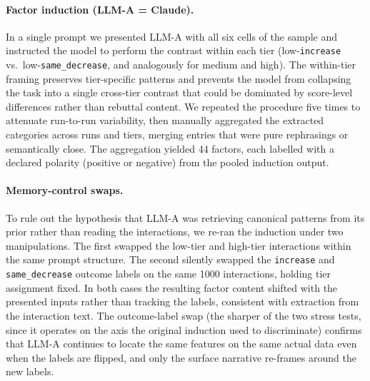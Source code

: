 \documentclass{article}
\newcommand{\code}[1]{\texttt{#1}}
\begin{document}
\paragraph{Factor induction (LLM-A = Claude).}
In a single prompt we presented LLM-A with all six cells of the sample and instructed the model to perform the contrast within each tier (low-\code{increase} vs.\ low-\code{same\_decrease}, and analogously for medium and high). The within-tier framing preserves tier-specific patterns and prevents the model from collapsing the task into a single cross-tier contrast that could be dominated by score-level differences rather than rebuttal content. We repeated the procedure five times to attenuate run-to-run variability, then manually aggregated the extracted categories across runs and tiers, merging entries that were pure rephrasings or semantically close. The aggregation yielded 44 factors, each labelled with a declared polarity (positive or negative) from the pooled induction output.

\paragraph{Memory-control swaps.}
To rule out the hypothesis that LLM-A was retrieving canonical patterns from its prior rather than reading the interactions, we re-ran the induction under two manipulations. The first swapped the low-tier and high-tier interactions within the same prompt structure. The second silently swapped the \code{increase} and \code{same\_decrease} outcome labels on the same \num{1000} interactions, holding tier assignment fixed. In both cases the resulting factor content shifted with the presented inputs rather than tracking the labels, consistent with extraction from the interaction text. The outcome-label swap (the sharper of the two stress tests, since it operates on the axis the original induction used to discriminate) confirms that LLM-A continues to locate the same features on the same actual data even when the labels are flipped, and only the surface narrative re-frames around the new labels.
\end{document}

